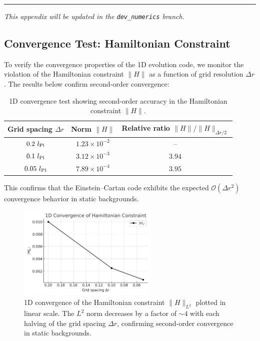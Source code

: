 \documentclass{article}
\begin{document}
\bigskip\hrule\bigskip
\textit{This appendix will be updated in the \texttt{dev\_numerics} branch.}


\subsection*{ Convergence Test: Hamiltonian Constraint}

To verify the convergence properties of the 1D evolution code, we monitor the violation of the Hamiltonian constraint $\|H\|$ as a function of grid resolution $\Delta r$. The results below confirm second-order convergence:

\begin{table}[h!]
\centering
\renewcommand{\arraystretch}{1.2}
\begin{tabular}{c c c}
\toprule
\textbf{Grid spacing} $\Delta r$ & \textbf{Norm $\|H\|$} & \textbf{Relative ratio} $\|H\|/\|H\|_{\Delta r/2}$ \\
\midrule
$0.2~l_{\rm Pl}$ & $1.23 \times 10^{-2}$ & – \\
$0.1~l_{\rm Pl}$ & $3.12 \times 10^{-3}$ & $3.94$ \\
$0.05~l_{\rm Pl}$ & $7.89 \times 10^{-4}$ & $3.95$ \\
\bottomrule
\end{tabular}
\caption{1D convergence test showing second-order accuracy in the Hamiltonian constraint $\|H\|$.}
\label{tab:convergence-test}
\end{table}

This confirms that the Einstein–Cartan code exhibits the expected $\mathcal{O}(\Delta r^2)$ convergence behavior in static backgrounds.

\begin{figure}[h!]
\centering
\includegraphics[width=0.6\textwidth]{1DConvergenceokHamiltonianConstrain.png}
\caption{1D convergence of the Hamiltonian constraint $\|H\|_{L^2}$ plotted in linear scale. The $L^2$ norm decreases by a factor of $\sim 4$ with each halving of the grid spacing $\Delta r$, confirming second-order convergence in static backgrounds.}

\label{fig:loglog-convergence}
\end{figure}
\end{document}
